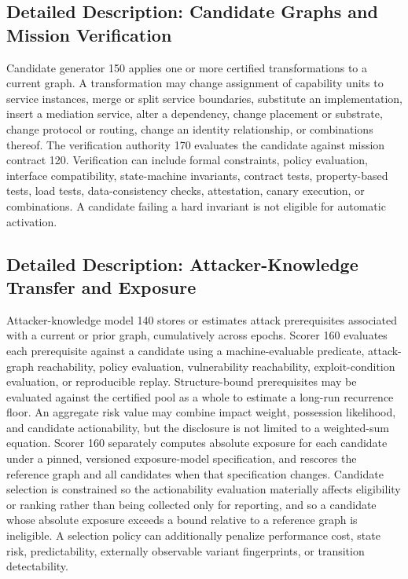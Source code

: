 \documentclass[11pt,letterpaper]{article}
\begin{document}
\subsection{Detailed Description: Candidate Graphs and Mission Verification}

Candidate generator 150 applies one or more certified transformations to a current graph. A transformation may change assignment of capability units to service instances, merge or split service boundaries, substitute an implementation, insert a mediation service, alter a dependency, change placement or substrate, change protocol or routing, change an identity relationship, or combinations thereof. The verification authority 170 evaluates the candidate against mission contract 120. Verification can include formal constraints, policy evaluation, interface compatibility, state-machine invariants, contract tests, property-based tests, load tests, data-consistency checks, attestation, canary execution, or combinations. A candidate failing a hard invariant is not eligible for automatic activation.

\subsection{Detailed Description: Attacker-Knowledge Transfer and Exposure}

Attacker-knowledge model 140 stores or estimates attack prerequisites associated with a current or prior graph, cumulatively across epochs. Scorer 160 evaluates each prerequisite against a candidate using a machine-evaluable predicate, attack-graph reachability, policy evaluation, vulnerability reachability, exploit-condition evaluation, or reproducible replay. Structure-bound prerequisites may be evaluated against the certified pool as a whole to estimate a long-run recurrence floor. An aggregate risk value may combine impact weight, possession likelihood, and candidate actionability, but the disclosure is not limited to a weighted-sum equation. Scorer 160 separately computes absolute exposure for each candidate under a pinned, versioned exposure-model specification, and rescores the reference graph and all candidates when that specification changes. Candidate selection is constrained so the actionability evaluation materially affects eligibility or ranking rather than being collected only for reporting, and so a candidate whose absolute exposure exceeds a bound relative to a reference graph is ineligible. A selection policy can additionally penalize performance cost, state risk, predictability, externally observable variant fingerprints, or transition detectability.
\end{document}
